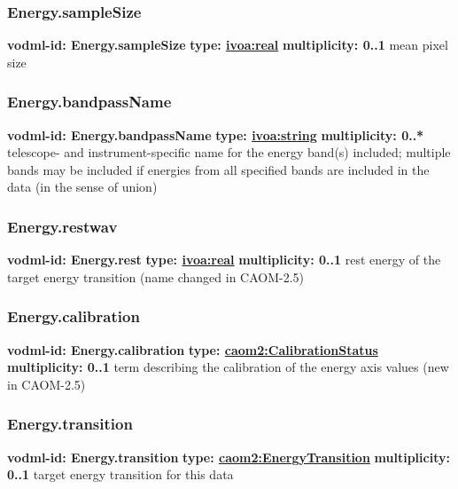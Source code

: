     \subsubsection{Energy.sampleSize}
      \textbf{vodml-id: Energy.sampleSize} \newline
      \textbf{type: \hyperref[sect:ivoa]{ivoa:real}} \newline
      \textbf{multiplicity: 0..1} \newline
      mean pixel size

    \subsubsection{Energy.bandpassName}
      \textbf{vodml-id: Energy.bandpassName} \newline
      \textbf{type: \hyperref[sect:ivoa]{ivoa:string}} \newline
      \textbf{multiplicity: 0..*} \newline
      telescope- and instrument-specific name for the energy band(s) included; multiple bands may be included if energies from all specified bands are included in the data (in the sense of union)

    \subsubsection{Energy.restwav}
      \textbf{vodml-id: Energy.rest} \newline
      \textbf{type: \hyperref[sect:ivoa]{ivoa:real}} \newline
      \textbf{multiplicity: 0..1} \newline
      rest energy of the target energy transition (name changed in CAOM-2.5)

    \subsubsection{Energy.calibration}
      \textbf{vodml-id: Energy.calibration} \newline
      \textbf{type: \hyperref[sect:CalibrationStatus]{caom2:CalibrationStatus}} \newline
      \textbf{multiplicity: 0..1} \newline
      term describing the calibration of the energy axis values (new in CAOM-2.5)

    \subsubsection{Energy.transition}
      \textbf{vodml-id: Energy.transition} \newline
      \textbf{type: \hyperref[sect:EnergyTransition]{caom2:EnergyTransition}} \newline
      \textbf{multiplicity: 0..1} \newline
      target energy transition for this data


